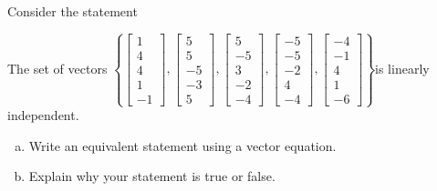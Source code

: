 
\begin{exerciseStatement}


Consider the statement 
\begin{center}\begin{minipage}{0.8\textwidth}
 The set of vectors \( \left\{ \left[\begin{array}{c}
1 \\
4 \\
4 \\
1 \\
-1
\end{array}\right] , \left[\begin{array}{c}
5 \\
5 \\
-5 \\
-3 \\
5
\end{array}\right] , \left[\begin{array}{c}
5 \\
-5 \\
3 \\
-2 \\
-4
\end{array}\right] , \left[\begin{array}{c}
-5 \\
-5 \\
-2 \\
4 \\
-4
\end{array}\right] , \left[\begin{array}{c}
-4 \\
-1 \\
4 \\
1 \\
-6
\end{array}\right] \right\} \)is linearly independent.
\end{minipage}\end{center}
    


\begin{enumerate}[(a)]
\item  Write an equivalent statement using a vector equation.
\item  Explain why your statement is true or false.
\end{enumerate}
    
\end{exerciseStatement}
    
